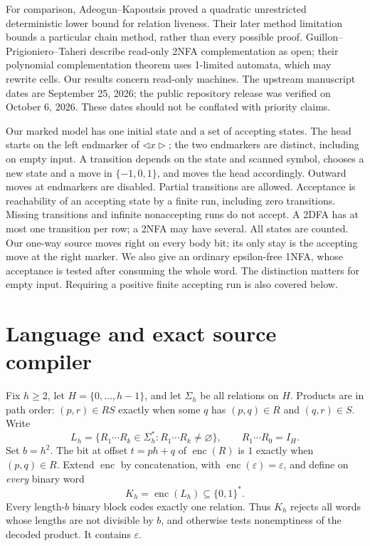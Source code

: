 \documentclass[11pt]{article}
\newcommand{\bits}{\{0,1\}}
\newcommand{\enc}{\operatorname{enc}}
\begin{document}
For comparison, Adeogun--Kapoutsis \cite[Theorem~1]{AdeogunKapoutsis2026}
proved a quadratic unrestricted deterministic lower bound for relation
liveness. Their later method limitation
\cite[Theorem~2.1]{AdeogunKapoutsisLimitation2026} bounds a particular chain
method, rather than every possible proof. Guillon--Prigioniero--Taheri
\cite[Section~1]{GuillonPrigionieroTaheri2026} describe read-only 2NFA
complementation as open; their polynomial complementation theorem uses
1-limited automata, which may rewrite cells. Our results concern read-only
machines. The upstream manuscript dates are September 25, 2026; the public
repository release was verified on October 6, 2026. These dates should not
be conflated with priority claims.

Our marked model has one initial state and a set of accepting states. The
head starts on the left endmarker of $\lhd x\rhd$; the two endmarkers are
distinct, including on empty input. A transition depends on the state and
scanned symbol, chooses a new state and a move in $\{-1,0,1\}$, and moves
the head accordingly. Outward moves at endmarkers are disabled. Partial
transitions are allowed. Acceptance is reachability of an accepting state
by a finite run, including zero transitions. Missing transitions and infinite
nonaccepting runs do not accept. A 2DFA has at most one transition per row;
a 2NFA may have several. All states are counted. Our one-way source moves
right on every body bit; its only stay is the accepting move at the right
marker. We also give an ordinary epsilon-free 1NFA, whose acceptance is
tested after consuming the whole word. The distinction matters for empty
input. Requiring a positive finite accepting run is also covered below.

\section{Language and exact source compiler}
Fix $h\ge2$, let $H=\{0,\ldots,h-1\}$, and let $\Sigma_h$ be all relations
on $H$. Products are in path order: $(p,r)\in RS$ exactly when some $q$
has $(p,q)\in R$ and $(q,r)\in S$. Write
\[
 L_h=\{R_1\cdots R_k\in\Sigma_h^*:R_1\cdots R_k\ne\varnothing\},
 \qquad R_1\cdots R_0=I_H.
\]
Set $b=h^2$. The bit at offset $t=ph+q$ of $\enc(R)$ is $1$ exactly when
$(p,q)\in R$. Extend $\enc$ by concatenation, with
$\enc(\varepsilon)=\varepsilon$, and define on \emph{every} binary word
\[
 K_h=\enc(L_h)\subseteq\bits^*.
\]
Every length-$b$ binary block codes exactly one relation. Thus $K_h$ rejects
all words whose lengths are not divisible by $b$, and otherwise tests
nonemptiness of the decoded product. It contains $\varepsilon$.
\end{document}
